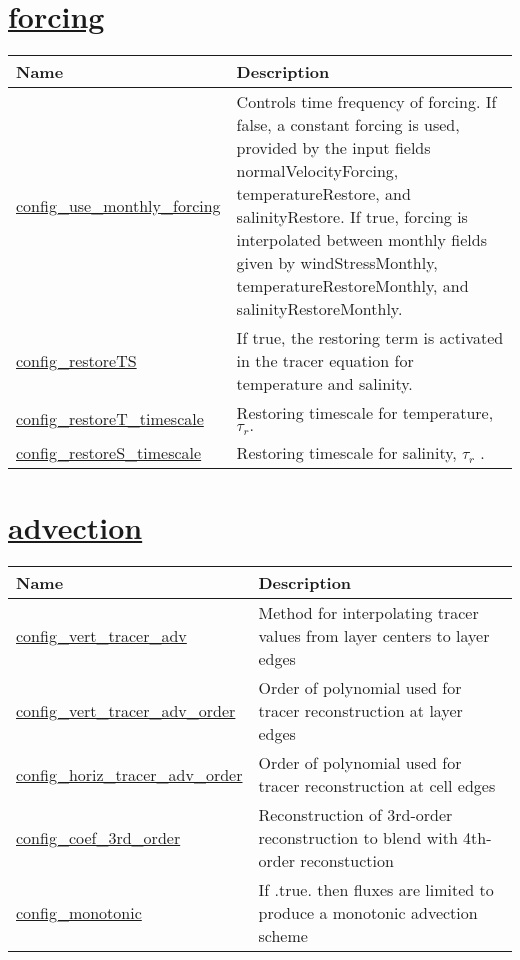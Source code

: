 \section[forcing]{\hyperref[sec:nm_sec_forcing]{forcing}}
\label{sec:nm_tab_forcing}

{\small
\begin{center}
\begin{longtable}{| p{2.0in} || p{4.0in} |}
	\hline
	{\bf Name} & {\bf Description} \\
	\hline
	\hline
	\hyperref[subsec:nm_sec_config_use_monthly_forcing]{config\_use\_monthly\_forcing} & Controls time frequency of forcing.  If false, a constant forcing is used, provided by the input fields normalVelocityForcing, temperatureRestore, and salinityRestore.  If true, forcing is interpolated between monthly fields given by windStressMonthly, temperatureRestoreMonthly, and salinityRestoreMonthly. \\
	\hline
	\hyperref[subsec:nm_sec_config_restoreTS]{config\_restoreTS} & If true, the restoring term is activated in the tracer equation for temperature and salinity. \\
	\hline
	\hyperref[subsec:nm_sec_config_restoreT_timescale]{config\_restoreT\_timescale} &  Restoring timescale for temperature,  $\tau_r.$  \\
	\hline
	\hyperref[subsec:nm_sec_config_restoreS_timescale]{config\_restoreS\_timescale} &  Restoring timescale for salinity,  $\tau_r$ . \\
	\hline
\end{longtable}
\end{center}
}
\section[advection]{\hyperref[sec:nm_sec_advection]{advection}}
\label{sec:nm_tab_advection}

{\small
\begin{center}
\begin{longtable}{| p{2.0in} || p{4.0in} |}
	\hline
	{\bf Name} & {\bf Description} \\
	\hline
	\hline
	\hyperref[subsec:nm_sec_config_vert_tracer_adv]{config\_vert\_tracer\_adv} & Method for interpolating tracer values from layer centers to layer edges \\
	\hline
	\hyperref[subsec:nm_sec_config_vert_tracer_adv_order]{config\_vert\_tracer\_adv\_order} & Order of polynomial used for tracer reconstruction at layer edges \\
	\hline
	\hyperref[subsec:nm_sec_config_horiz_tracer_adv_order]{config\_horiz\_tracer\_adv\_order} & Order of polynomial used for tracer reconstruction at cell edges \\
	\hline
	\hyperref[subsec:nm_sec_config_coef_3rd_order]{config\_coef\_3rd\_order} & Reconstruction of 3rd-order reconstruction to blend with 4th-order reconstuction \\
	\hline
	\hyperref[subsec:nm_sec_config_monotonic]{config\_monotonic} & If .true. then fluxes are limited to produce a monotonic advection scheme \\
	\hline
\end{longtable}
\end{center}
}
